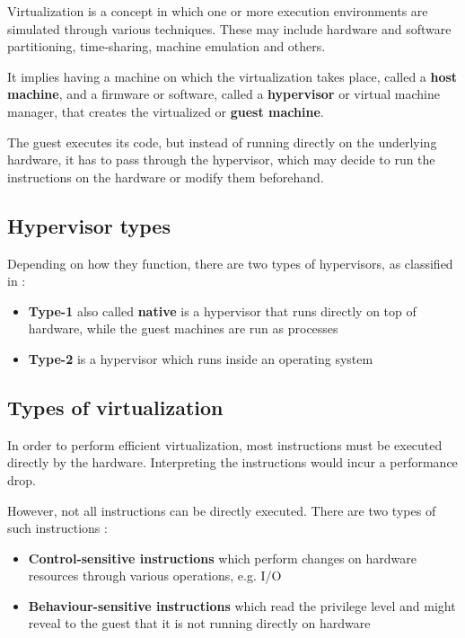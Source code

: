 
Virtualization is a concept in which one or more execution environments are simulated through various techniques. These may include hardware and software partitioning, time-sharing, machine emulation and others.\cite{intr-virtualization}

It implies having a machine on which the virtualization takes place, called a \textbf{host machine}, and a firmware or software, called a \textbf{hypervisor} or virtual machine manager, that creates the virtualized or \textbf{guest machine}.

The guest executes its code, but instead of running directly on the underlying hardware, it has to pass through the hypervisor, which may decide to run the instructions on the hardware or modify them beforehand.

\subsection{Hypervisor types}
\label{subsec:hypertypes}

Depending on how they function, there are two types of hypervisors, as classified in \cite{formal-virt}:
\begin{itemize}
\item
\textbf{Type-1} also called \textbf{native} is a hypervisor that runs directly on top of hardware, while the guest machines are run as processes
\item
\textbf{Type-2} is a hypervisor which runs inside an operating system
\end{itemize}

\subsection{Types of virtualization}
\label{subsec:typesvirt}

In order to perform efficient virtualization, most instructions must be executed directly by the hardware. Interpreting the instructions would incur a performance drop\cite{virt-embedded}. 

However, not all instructions can be directly executed. There are two types of such instructions\cite{virt-embedded} :
\begin{itemize}
\item
\textbf{Control-sensitive instructions} which perform changes on hardware resources through various operations, e.g. I/O
\item
\textbf{Behaviour-sensitive instructions} which read the privilege level and might reveal to the guest that it is not running directly on hardware
\end{itemize}

